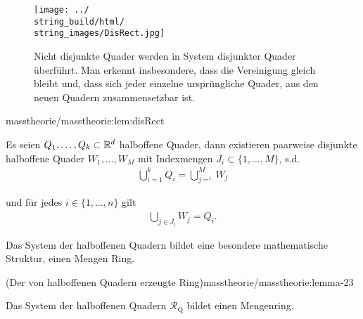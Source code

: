 \begin{figure}[htbp]
\centering


\noindent\texttt{[image: ../\\string\_build/html/\\string\_images/DisRect.jpg]}
\caption{Nicht disjunkte Quader werden in System disjunkter Quader überführt. Man erkennt insbesondere, dass die Vereinigung gleich bleibt und, dass sich jeder einzelne ursprüngliche Quader, aus den neuen Quadern zusammensetzbar ist.}\label{\detokenize{masstheorie/masstheorie:fig-disrect}}\end{figure}
\begin{lemma}{}{masstheorie/masstheorie:lem:disRect}



\par
Es seien \(Q_1,\ldots,Q_k\subset\mathbb{R}^d\) halboffene Quader, dann existieren paarweise disjunkte halboffene Quader \(W_1,\ldots, W_M\) mit Indexmengen \(J_i\subset\{1,\ldots,M\}\), s.d.
\begin{align*}
\bigcup_{i=1}^k Q_i = \bigcup_{j=^1}^M W_j
\end{align*}
\par
und für jedes \(i\in\{1,\ldots,n\}\) gilt
\begin{align*}
\bigcup_{j\in J_i} W_j = Q_i.
\end{align*}\end{lemma}

\par
Das System der halboffenen Quadern bildet eine besondere mathematische Struktur, einen Mengen Ring.
\begin{lemma}{(Der von halboffenen Quadern erzeugte Ring)}{masstheorie/masstheorie:lemma-23}



\par
Das System der halboffenen Quadern \(\mathcal{R}_{\text{Q}}\) bildet einen Mengenring.
\end{lemma}

